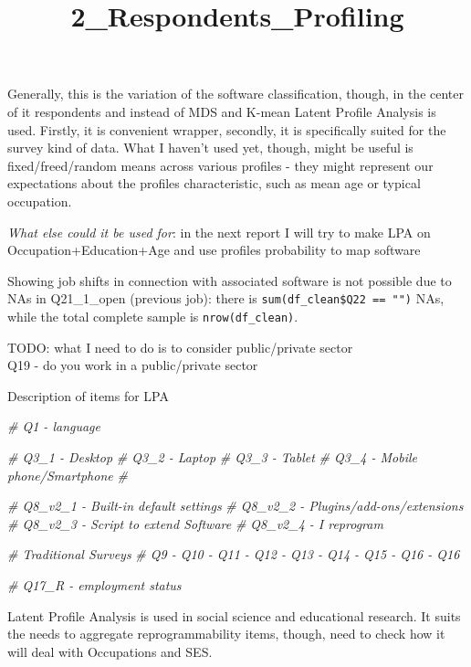 \documentclass[]{article}
\title{2\_Respondents\_Profiling}
\author{}
\date{}
\newenvironment{Shaded}{\begin{snugshade}}{\end{snugshade}}
\newcommand{\CommentTok}[1]{\textcolor[rgb]{0.56,0.35,0.01}{\textit{{#1}}}}
\begin{document}
\maketitle

Generally, this is the variation of the software classification, though,
in the center of it respondents and instead of MDS and K-mean Latent
Profile Analysis is used. Firstly, it is convenient wrapper, secondly,
it is specifically suited for the survey kind of data. What I haven't
used yet, though, might be useful is fixed/freed/random means across
various profiles - they might represent our expectations about the
profiles characteristic, such as mean age or typical occupation.

\emph{What else could it be used for}: in the next report I will try to
make LPA on Occupation+Education+Age and use profiles probability to map
software

Showing job shifts in connection with associated software is not
possible due to NAs in Q21\_1\_open (previous job): there is
\texttt{sum(df\_clean\$Q22\ ==\ "")} NAs, while the total complete
sample is \texttt{nrow(df\_clean)}.

TODO: what I need to do is to consider public/private sector\\
Q19 - do you work in a public/private sector

Description of items for LPA

\begin{Shaded}
\begin{Highlighting}[]
\CommentTok{# Q1 - language}

\CommentTok{# Q3_1 - Desktop}
\CommentTok{# Q3_2 - Laptop}
\CommentTok{# Q3_3 - Tablet}
\CommentTok{# Q3_4 - Mobile phone/Smartphone}
\CommentTok{#}

\CommentTok{# Q8_v2_1 - Built-in default settings}
\CommentTok{# Q8_v2_2 - Plugins/add-ons/extensions}
\CommentTok{# Q8_v2_3 - Script to extend Software}
\CommentTok{# Q8_v2_4 - I reprogram}

\CommentTok{# Traditional Surveys}
\CommentTok{# Q9 - Q10 - Q11 - Q12 - Q13 - Q14 - Q15 - Q16 - Q16}

\CommentTok{# Q17_R - employment status}
\end{Highlighting}
\end{Shaded}

Latent Profile Analysis is used in social science and educational
research. It suits the needs to aggregate reprogrammability items,
though, need to check how it will deal with Occupations and SES.
\end{document}
